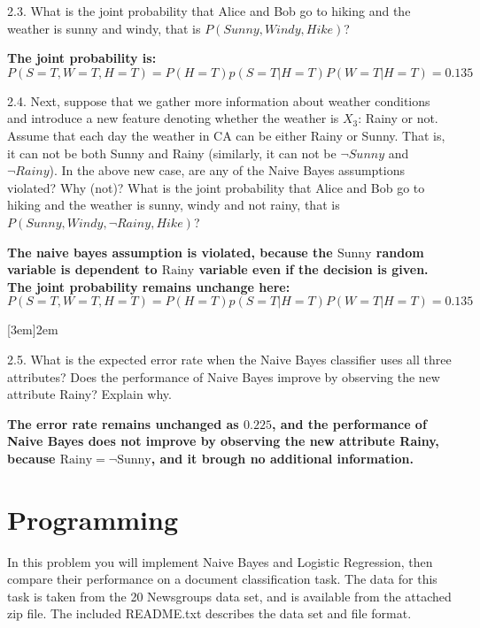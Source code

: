\documentclass{article}
\theoremstyle{definition}
\theoremstyle{definition}
\theoremstyle{remark}
\begin{document}
2.3. What is the joint probability that Alice and Bob go to hiking and the weather is sunny and
windy, that is $P(Sunny,Windy,Hike)$?
\begin{addmargin}[3em]{2em}
  \textbf{ The joint probability is:}
\[
P(S=T,W=T,H=T) = P(H=T)p(S=T|H=T)P(W=T|H=T) = 0.135
\]
\end{addmargin}

2.4. Next, suppose that we gather more information about weather conditions and introduce a new feature
denoting whether the weather is $X_3$: Rainy or not. Assume that each day the weather in CA can
be either Rainy or Sunny. That is, it can not be both Sunny and Rainy (similarly, it can not be
$\neg Sunny$ and $\neg Rainy$). In the above new case, are any of the Naive Bayes assumptions violated? Why (not)? What is
the joint probability that Alice and Bob go to hiking and the weather is sunny, windy and not
rainy, that is $P(Sunny,Windy,\neg Rainy,Hike)$?

\begin{addmargin}[3em]{2em}
  \textbf{The naive bayes assumption is violated, because the $\mbox{Sunny}$ random variable is dependent to $\mbox{Rainy}$ variable even if the decision is given. The joint probability remains unchange here:}
  \[
  P(S=T,W=T,H=T) = P(H=T)p(S=T|H=T)P(W=T|H=T) = 0.135
  \]
\end{addmargin}[3em]{2em}

2.5. What is the expected error rate when the Naive Bayes classifier uses all three attributes? Does
the performance of Naive Bayes improve by observing the new attribute Rainy? Explain why.

\begin{addmargin}[3em]{2em}
  \textbf{The error rate remains unchanged as $0.225$, and the performance of Naive Bayes does not improve by observing the new attribute Rainy, because $\mbox{Rainy} = \neg \mbox{Sunny}$, and it brough no additional information.}
\end{addmargin}


\section*{Programming}
In this problem you will implement Naive Bayes and Logistic Regression, then compare their performance on a
document classification task. The data for this task is taken from the 20 Newsgroups data set, and is available
from the attached zip file. The included README.txt describes the data set and file format.
\end{document}
